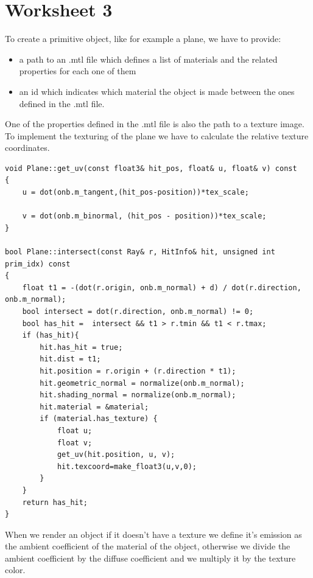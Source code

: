 \section{Worksheet 3}
To create a primitive object, like for example a plane, we have to provide:
\begin{itemize}
	\item  a path to an .mtl file which defines a list of materials and the related properties for each one of them
	\item an id which indicates which material the object is made between the ones defined in the .mtl file.
\end{itemize}
One of the properties defined in the .mtl file is also the path to a texture image.\\
To implement the texturing of the plane we have to calculate the relative texture coordinates.
\begin{lstlisting}
void Plane::get_uv(const float3& hit_pos, float& u, float& v) const 
{ 	
	u = dot(onb.m_tangent,(hit_pos-position))*tex_scale;
	
	v = dot(onb.m_binormal, (hit_pos - position))*tex_scale;
}

bool Plane::intersect(const Ray& r, HitInfo& hit, unsigned int prim_idx) const
{	
	float t1 = -(dot(r.origin, onb.m_normal) + d) / dot(r.direction, onb.m_normal);
	bool intersect = dot(r.direction, onb.m_normal) != 0;
	bool has_hit =  intersect && t1 > r.tmin && t1 < r.tmax;
	if (has_hit){
		hit.has_hit = true;
		hit.dist = t1;
		hit.position = r.origin + (r.direction * t1);
		hit.geometric_normal = normalize(onb.m_normal);
		hit.shading_normal = normalize(onb.m_normal);
		hit.material = &material;
		if (material.has_texture) {
			float u;
			float v;
			get_uv(hit.position, u, v);
			hit.texcoord=make_float3(u,v,0);
		}
	}
	return has_hit;
}
\end{lstlisting}
When we render an object if it doesn't have a texture we define it's emission as the ambient coefficient of the material of the object, otherwise we divide the ambient coefficient by the diffuse coefficient and we multiply it by the texture color.
